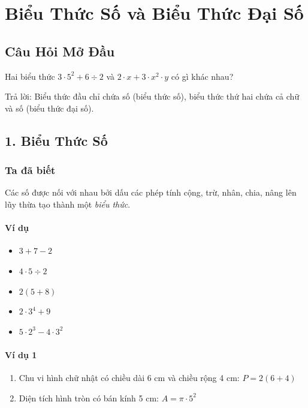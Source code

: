 \documentclass[
]{article}
\author{}
\date{\vspace{-2.5em}}
\providecommand{\tightlist}{%
  \setlength{\itemsep}{0pt}\setlength{\parskip}{0pt}}
\begin{document}
\section{Biểu Thức Số và Biểu Thức Đại
Số}\label{biux1ec3u-thux1ee9c-sux1ed1-vuxe0-biux1ec3u-thux1ee9c-ux111ux1ea1i-sux1ed1}

\subsection{Câu Hỏi Mở Đầu}\label{cuxe2u-hux1ecfi-mux1edf-ux111ux1ea7u}

Hai biểu thức \(3 \cdot 5^2 + 6 \div 2\) và
\(2 \cdot x + 3 \cdot x^2 \cdot y\) có gì khác nhau?

Trả lời: Biểu thức đầu chỉ chứa số (biểu thức số), biểu thức thứ hai
chứa cả chữ và số (biểu thức đại số).

\subsection{1. Biểu Thức Số}\label{biux1ec3u-thux1ee9c-sux1ed1}

\subsubsection{Ta đã biết}\label{ta-ux111uxe3-biux1ebft}

Các số được nối với nhau bởi dấu các phép tính cộng, trừ, nhân, chia,
nâng lên lũy thừa tạo thành một \emph{biểu thức}.

\paragraph{Ví dụ}\label{vuxed-dux1ee5}

\begin{itemize}
\tightlist
\item
  \(3 + 7 - 2\)
\item
  \(4 \cdot 5 \div 2\)
\item
  \(2(5 + 8)\)
\item
  \(2 \cdot 3^4 + 9\)
\item
  \(5 \cdot 2^3 - 4 \cdot 3^2\)
\end{itemize}

\paragraph{Ví dụ 1}\label{vuxed-dux1ee5-1}

\begin{enumerate}
\def\labelenumi{\alph{enumi})}
\item
  Chu vi hình chữ nhật có chiều dài 6 cm và chiều rộng 4 cm:
  \(P = 2(6 + 4)\)
\item
  Diện tích hình tròn có bán kính 5 cm: \(A = \pi \cdot 5^2\)
\end{enumerate}
\end{document}
